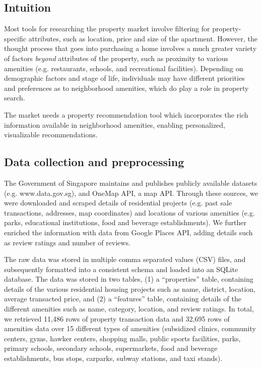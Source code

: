 \documentclass[a4paper, 11pt]{article}
\begin{document}
	\subsection{Intuition}

	Most tools for researching the property market involve filtering for property-specific attributes, such as location, price and size of the apartment. However, the thought process that goes into purchasing a home involves a much greater variety of factors \textit{beyond} attributes of the property, such as proximity to various amenities (e.g. restaurants, schools, and recreational facilities). Depending on demographic factors and stage of life, individuals may have different priorities and preferences as to neighborhood amenities, which do play a role in property search.

	The market needs a property recommendation tool which incorporates the rich information available in neighborhood amenities, enabling personalized, visualizable recommendations.

	\subsection{Data collection and preprocessing}

	The Government of Singapore maintains and publishes publicly available datasets (e.g. www.data.gov.sg), and OneMap API, a map API. Through these sources, we were downloaded and scraped details of residential projects (e.g. past sale transactions, addresses, map coordinates) and locations of various amenities (e.g. parks, educational institutions, food and beverage establishments). We further enriched the information with data from Google Places API, adding details such as review ratings and number of reviews.

	The raw data was stored in multiple comma separated values (CSV) files, and subsequently formatted into a consistent schema and loaded into an SQLite database. The data was stored in two tables, (1) a “properties” table, containing details of the various residential housing projects such as name, district, location, average transacted price, and (2) a “features” table, containing details of the different amenities such as name, category, location, and review ratings. In total, we retrieved 11,486 rows of property transaction data and 32,695 rows of amenities data over 15 different types of amenities (subsidized clinics, community centers, gyms, hawker centers, shopping malls, public sports facilities, parks, primary schools, secondary schools, supermarkets, food and beverage establishments, bus stops, carparks, subway stations, and taxi stands).
\end{document}
